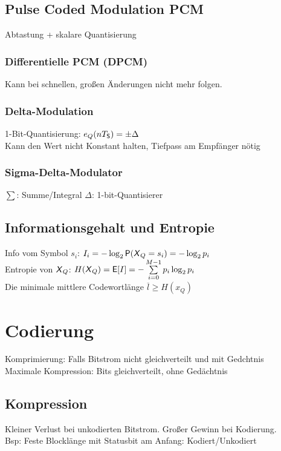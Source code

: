 \documentclass[fs, footer]{latex4ei}
\begin{document}
\begin{multicols*}{4}
	\subsection{Pulse Coded Modulation PCM}
	Abtastung + skalare Quantisierung\\
	
		\subsubsection{Differentielle PCM (DPCM)}
		Kann bei schnellen, großen Änderungen nicht mehr folgen.\\

		\subsubsection{Delta-Modulation}
		1-Bit-Quantisierung: $e_Q(nT_{\sf S}) = \pm \Delta$\\
		Kann den Wert nicht Konstant halten, Tiefpass am Empfänger nötig\\

		\subsubsection{Sigma-Delta-Modulator}
		$\sum$: Summe/Integral \qquad $\Delta$: 1-bit-Quantisierer


	\subsection{Informationsgehalt und Entropie}
	Info vom Symbol $s_i$: $I_i = - \log_2 \operatorname{\textsf{P}}(\operatorname{\textsf{\textit{X}}}_Q = s_i) = -\log_2 p_i$\\ 
	Entropie von $\operatorname{\textsf{\textit{X}}}_Q$: $H(\operatorname{\textsf{\textit{X}}}_Q) = \operatorname{\textsf{E}}[I] = - \sum\limits_{i = 0}^{M-1} p_i \log_2 p_i$\\

	Die minimale mittlere Codewortlänge $\overline l \ge H(x_Q)$
\section{Codierung}
	Komprimierung: Falls Bitstrom nicht gleichverteilt und mit Gedchtnis\\
	Maximale Kompression: Bits gleichverteilt, ohne Gedächtnis\\

	\subsection{Kompression}
	Kleiner Verlust bei unkodierten Bitstrom. Großer Gewinn bei Kodierung.\\
	Bsp: Feste Blocklänge mit Statusbit am Anfang: Kodiert/Unkodiert\\
	

\end{multicols*}
\end{document}
